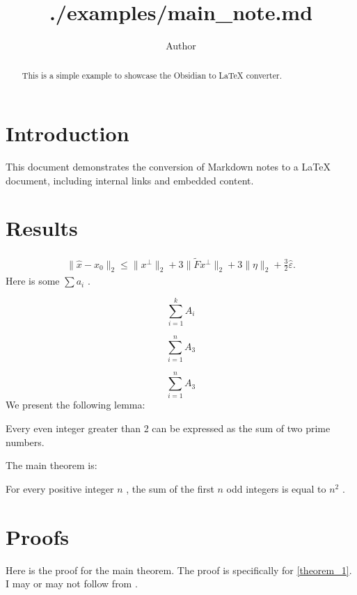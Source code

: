 \documentclass{article}
\title{./examples/main_note.md}
\author{Author}
\begin{document}
\maketitle
\begin{abstract}
This is a simple example to showcase the Obsidian to LaTeX converter.


\end{abstract}

\section{Introduction}
\label{section:Introduction}
This document demonstrates the conversion of Markdown notes to a LaTeX document, including internal links and embedded content.

\section{Results}
\label{section:Results}

\begin{align*}
  \|\hat x - x_0\|_2
  \leq \|x^\perp\|_2 + 3\|\tilde{F}x^\perp\|_2 + 3 \|\eta\|_2 + \frac{3}{2}\hat\varepsilon.
\end{align*}
Here is some  $\sum a_i$ .

\begin{equation*}
\sum_{i=1}^k A_i
\end{equation*}

\begin{equation*}
\sum_{i=1}^n A_3
\end{equation*}

\begin{equation*}
\sum_{i=1}^n A_3
\end{equation*}
We present the following lemma:

\begin{lemma}[lemma_1]
\label{lemma_1}
Every even integer greater than 2 can be expressed as the sum of two prime numbers.


\end{lemma}

The main theorem is:

\begin{theorem}[theorem_1]
\label{theorem_1}
For every positive integer  $n$ , the sum of the first  $n$  odd integers is equal to  $n^2$ .


\end{theorem}


\section{Proofs}
\label{section:Proofs}
Here is the proof for the main theorem. The proof is specifically for \autoref{theorem_1}. I may or may not follow from \cite{rudelsonSparseReconstructionFourier2008}.
\end{document}

